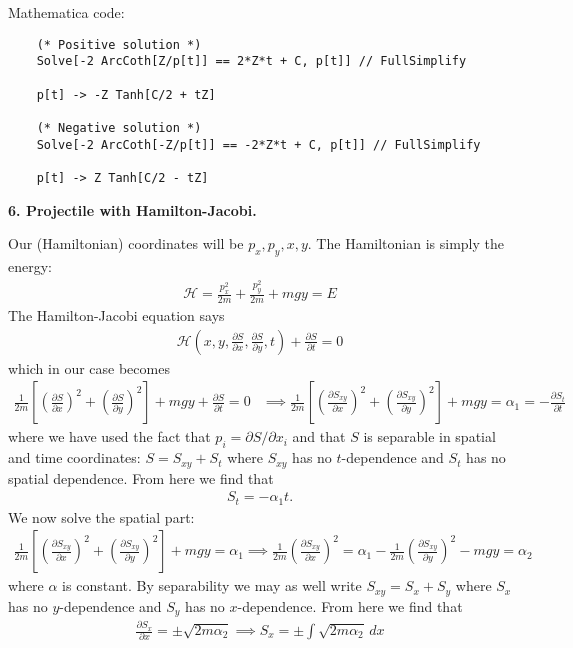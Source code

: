 \documentclass{article}
\theoremstyle{definition}
\newcommand{\p}{\partial}
\newcommand{\ham}{\mathcal{H}}
\newcommand{\al}{\alpha}
\newcommand{\f}[2]{\frac{#1}{#2}}
\newcommand{\lp}{\left(}
\newcommand{\rp}{\right)}
\newcommand{\lb}{\left[}
\newcommand{\rb}{\right]}
\begin{document}
\begin{enumerate}[label=(\alph*)]
	Mathematica code:
	\begin{lstlisting}
	(* Positive solution *)
	Solve[-2 ArcCoth[Z/p[t]] == 2*Z*t + C, p[t]] // FullSimplify
	
	p[t] -> -Z Tanh[C/2 + tZ]
	
	(* Negative solution *)
	Solve[-2 ArcCoth[-Z/p[t]] == -2*Z*t + C, p[t]] // FullSimplify
	
	p[t] -> Z Tanh[C/2 - tZ]
	\end{lstlisting}
	
\end{enumerate}




\noindent \textbf{6. Projectile with Hamilton-Jacobi.}

Our (Hamiltonian) coordinates will be $p_x, p_y, x,y$. The Hamiltonian is simply the energy:
\begin{align*}
\ham = \f{p_x^2}{2m} + \f{p_y^2}{2m} + mgy = E
\end{align*}
The Hamilton-Jacobi equation says 
\begin{align*}
\ham \lp x,y, \f{\p S}{\p x}, \f{\p S}{\p y}, t \rp + \f{\p S}{\p t} = 0
\end{align*}
which in our case becomes
\begin{align*}
\f{1}{2m} \lb \lp \f{\p S}{\p x} \rp^2 + \lp\f{\p S}{\p y}\rp^2 \rb + mgy + \f{\p S}{\p t} = 0 &\implies 
\f{1}{2m} \lb \lp \f{\p S_{xy}}{\p x} \rp^2 + \lp\f{\p S_{xy}}{\p y}\rp^2 \rb + mgy  = \al_1 = -\f{\p S_t}{\p t}
\end{align*}
where we have used the fact that $p_i = \p S / \p x_i$ and that $S$ is separable in spatial and time coordinates: $S = S_{xy} + S_t$ where $S_{xy}$ has no $t$-dependence and $S_t$ has no spatial dependence. From here we find that
\begin{align*}
S_t = -\al_1 t.
\end{align*}
We now solve the spatial part:
\begin{align*}
\f{1}{2m} \lb \lp \f{\p S_{xy}}{\p x} \rp^2 + \lp\f{\p S_{xy}}{\p y}\rp^2 \rb + mgy  = \al_1 \implies \f{1}{2m}\lp  \f{\p S_{xy}}{\p x}\rp^2  =  \al_1 - \f{1}{2m}\lp \f{\p S_{xy}}{\p y} \rp^2 -mgy = \al_2
\end{align*}
where $\al$ is constant. By separability we may as well write $S_{xy} = S_x + S_y$ where $S_x$ has no $y$-dependence and $S_y$ has no $x$-dependence. From here we find that 
\begin{align*}
\f{\p S_x}{\p x} = \pm\sqrt{2m \al_2 } \implies S_x = \pm \int \sqrt{2m\al_2}\,dx
\end{align*}
\end{document}
